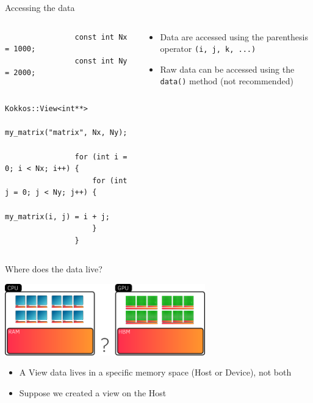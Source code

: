 \documentclass[aspectratio=169]{beamer}
\begin{document}
\begin{frame}[fragile]{Accessing the data}
    \begin{columns}
        \begin{column}{0.6\linewidth}
            \begin{verbatim}
                const int Nx = 1000;
                const int Ny = 2000;

                Kokkos::View<int**>
                    my_matrix("matrix", Nx, Ny);

                for (int i = 0; i < Nx; i++) {
                    for (int j = 0; j < Ny; j++) {
                        my_matrix(i, j) = i + j;
                    }
                }
            \end{verbatim}
        \end{column}
        \begin{column}{0.4\linewidth}
            \begin{itemize}
                \item Data are accessed using the parenthesis operator \texttt{(i, j, k, ...)}
                \item Raw data can be accessed using the \texttt{data()} method (not recommended)
            \end{itemize}
        \end{column}
    \end{columns}
\end{frame}


\begin{frame}{Where does the data live?}
    \begin{center}
        \includegraphics[width=0.65\textwidth]{view_memory.png}
    \end{center}
    \begin{itemize}
        \item A View data lives in a specific memory space (Host or Device), not both
        \item Suppose we created a view on the Host
    \end{itemize}
\end{frame}
\end{document}
